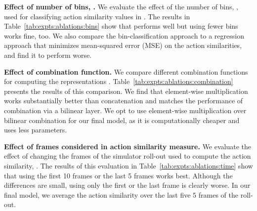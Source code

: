 \documentclass{article}
\begin{document}
{\bf \noindent Effect of number of bins, .} We evaluate the effect of the number of bins, , used for classifying action similarity values in . The results in Table~\ref{tab:expts:ablations:bins} show that  performs well but using fewer bins works fine, too. We also compare the bin-classification approach to a regression approach that minimizes mean-squared error (MSE) on the action similarities, and find it to perform worse.

{\bf \noindent Effect of combination function.} We compare different combination functions  for computing the representations . Table~\ref{tab:expts:ablations:combination} presents the results of this comparison. We find that element-wise multiplication  works substantially better than concatenation and matches the performance of combination via a bilinear layer. We opt to use element-wise multiplication over bilinear combination for our final model, as it is computationally cheaper and uses less parameters.

{\bf \noindent Effect of frames considered in action similarity measure.} We evaluate the effect of changing the frames of the simulator roll-out used to compute the action similarity, . The results of this evaluation in Table~\ref{tab:expts:ablations:time} show that using the first 10 frames or the last 5 frames works best. Although the differences are small, using only the first or the last frame is clearly worse.
In our final model, we average the action similarity over the last five 5 frames of the roll-out.
\end{document}
